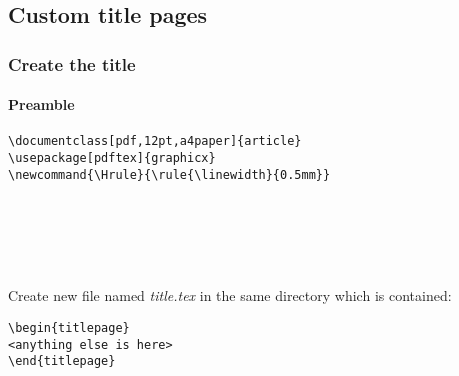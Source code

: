 \subsection{Custom title pages}
\subsubsection{Create the title}

\paragraph{Preamble}
\begin{verbatim}
\documentclass[pdf,12pt,a4paper]{article}
\usepackage[pdftex]{graphicx}
\newcommand{\Hrule}{\rule{\linewidth}{0.5mm}}






\end{verbatim}

\paragraph{}
Create new file named \emph{title.tex} in the same directory which is contained:
\begin{verbatim}
\begin{titlepage}
<anything else is here>
\end{titlepage}
\end{verbatim}

